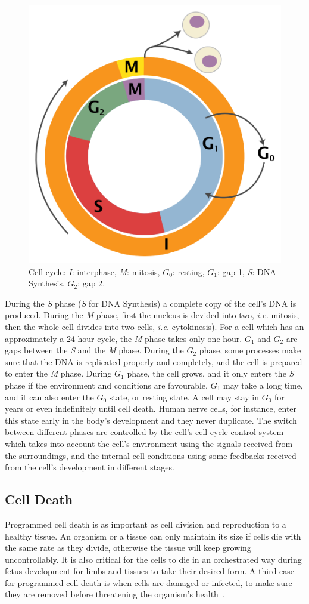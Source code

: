 \begin{figure}[!ht]
  \centering
  \includegraphics[width=.5\textwidth]{figs/background/470px-Cell_Cycle_2-2}
  \caption{Cell cycle: \emph{I}: interphase, \emph{M}: mitosis, \emph{$G_0$}: resting, \emph{$G_1$}: gap 1, \emph{S}: DNA Synthesis, \emph{$G_2$}: gap 2.\protect\footnotemark}
  \label{fig:bkg:cell-cycle}
\end{figure}

During the \emph{S} phase (\emph{S} for DNA Synthesis) a complete copy of the cell's DNA is produced. During the \emph{M} phase, first the nucleus is devided into two, \emph{i.e.} mitosis, then the whole cell divides into two cells, \emph{i.e.} cytokinesis). For a cell which has an approximately a 24 hour cycle, the \emph{M} phase takes only one hour. $G_1$ and $G_2$ are gaps between the \emph{S} and the \emph{M} phase. During the $G_2$ phase, some processes make sure that the DNA is replicated properly and completely, and the cell is prepared to enter the \emph{M} phase. During $G_1$ phase, the cell grows, and it only enters the \emph{S} phase if the environment and conditions are favourable. $G_1$ may take a long time, and it can also enter the $G_0$ state, or resting state. A cell may stay in $G_0$ for years or even indefinitely until cell death. Human nerve cells, for instance, enter this state early in the body's development and they never duplicate. The switch between different phases are controlled by the cell's cell cycle control system which takes into account the cell's environment using the signals received from the surroundings, and the internal cell conditions using some feedbacks received from the cell's development in different stages.

\subsection{Cell Death}
Programmed cell death is as important as cell division and reproduction to a healthy tissue. An organism or a tissue can only maintain its size if cells die with the same rate as they divide, otherwise the tissue will keep growing uncontrollably. It is also critical for the cells to die in an orchestrated way during fetus development for limbs and tissues to take their desired form. A third case for programmed cell death is when cells are damaged or infected, to make sure they are removed before threatening the organism's health~\cite[Ch. 18]{the-cell}.

